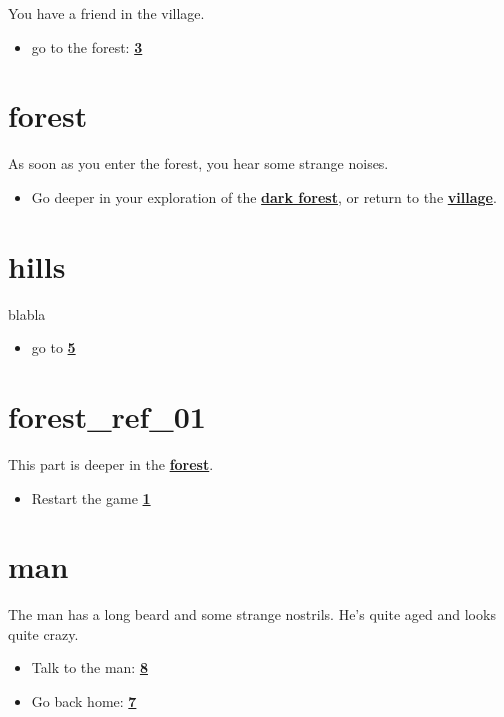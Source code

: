 \documentclass[openany]{book} %
\begin{document}
\begin{LARGE}
You have a friend in the village.

\begin{itemize}
\item go to the forest: \textbf{\href{\#3}{3}}
\end{itemize}

\hypertarget{forest}{}
\pagebreak[\PAGExBREAKxPOLICY]
\chapter{forest}

As soon as you enter the forest, you hear some strange noises.

\begin{itemize}
\item Go deeper in your exploration of the \textbf{\href{\#forest\_ref\_01}{dark forest}}, or return to the \textbf{\href{\#village}{village}}.
\end{itemize}

\hypertarget{hills}{}
\pagebreak[\PAGExBREAKxPOLICY]
\chapter{hills}

blabla 

\begin{itemize}
\item go to \textbf{\href{\#5}{5}}
\end{itemize}

\hypertarget{forest_ref_01}{}
\pagebreak[\PAGExBREAKxPOLICY]
\chapter{forest\_ref\_01}

This part is deeper in the \textbf{\href{\#forest}{forest}}.

\begin{itemize}
\item Restart the game \textbf{\href{\#1}{1}}
\end{itemize}

\hypertarget{man}{}
\pagebreak[\PAGExBREAKxPOLICY]
\chapter{man}

The man has a long beard and some strange nostrils. He's quite aged and looks quite crazy.

\begin{itemize}
\item Talk to the man: \textbf{\href{\#8}{8}}
\item Go back home: \textbf{\href{\#7}{7}}
\end{itemize}


\end{LARGE}
\end{document}
